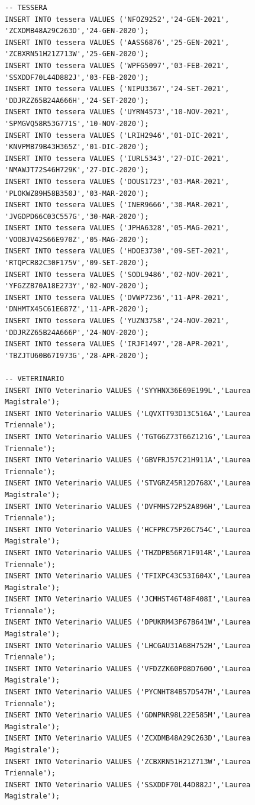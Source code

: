 \documentclass[12pt]{report}
\begin{document}
\begin{scriptsize}
\begin{verbatim}
-- TESSERA
INSERT INTO tessera VALUES ('NFOZ9252','24-GEN-2021', 'ZCXDMB48A29C263D','24-GEN-2020');
INSERT INTO tessera VALUES ('AASS6876','25-GEN-2021', 'ZCBXRN51H21Z713W','25-GEN-2020');
INSERT INTO tessera VALUES ('WPFG5097','03-FEB-2021', 'SSXDDF70L44D882J','03-FEB-2020');
INSERT INTO tessera VALUES ('NIPU3367','24-SET-2021', 'DDJRZZ65B24A666H','24-SET-2020');
INSERT INTO tessera VALUES ('UYRN4573','10-NOV-2021', 'SPMGVQ58R53G771S','10-NOV-2020');
INSERT INTO tessera VALUES ('LRIH2946','01-DIC-2021', 'KNVPMB79B43H365Z','01-DIC-2020');
INSERT INTO tessera VALUES ('IURL5343','27-DIC-2021', 'NMAWJT72S46H729K','27-DIC-2020');
INSERT INTO tessera VALUES ('DOUS1723','03-MAR-2021', 'PLOKWZ89H58B350J','03-MAR-2020');
INSERT INTO tessera VALUES ('INER9666','30-MAR-2021', 'JVGDPD66C03C557G','30-MAR-2020');
INSERT INTO tessera VALUES ('JPHA6328','05-MAG-2021', 'VOOBJV42S66E970Z','05-MAG-2020');
INSERT INTO tessera VALUES ('HDOE3730','09-SET-2021', 'RTQPCR82C30F175V','09-SET-2020');
INSERT INTO tessera VALUES ('SODL9486','02-NOV-2021', 'YFGZZB70A18E273Y','02-NOV-2020');
INSERT INTO tessera VALUES ('DVWP7236','11-APR-2021', 'DNHMTX45C61E687Z','11-APR-2020');
INSERT INTO tessera VALUES ('YUZN3758','24-NOV-2021', 'DDJRZZ65B24A666P','24-NOV-2020');
INSERT INTO tessera VALUES ('IRJF1497','28-APR-2021', 'TBZJTU60B67I973G','28-APR-2020');

-- VETERINARIO
INSERT INTO Veterinario VALUES ('SYYHNX36E69E199L','Laurea Magistrale');
INSERT INTO Veterinario VALUES ('LQVXTT93D13C516A','Laurea Triennale');
INSERT INTO Veterinario VALUES ('TGTGGZ73T66Z121G','Laurea Triennale');
INSERT INTO Veterinario VALUES ('GBVFRJ57C21H911A','Laurea Triennale');
INSERT INTO Veterinario VALUES ('STVGRZ45R12D768X','Laurea Magistrale');
INSERT INTO Veterinario VALUES ('DVFMHS72P52A896H','Laurea Triennale');
INSERT INTO Veterinario VALUES ('HCFPRC75P26C754C','Laurea Magistrale');
INSERT INTO Veterinario VALUES ('THZDPB56R71F914R','Laurea Triennale');
INSERT INTO Veterinario VALUES ('TFIXPC43C53I604X','Laurea Magistrale');
INSERT INTO Veterinario VALUES ('JCMHST46T48F408I','Laurea Triennale');
INSERT INTO Veterinario VALUES ('DPUKRM43P67B641W','Laurea Magistrale');
INSERT INTO Veterinario VALUES ('LHCGAU31A68H752H','Laurea Triennale');
INSERT INTO Veterinario VALUES ('VFDZZK60P08D760O','Laurea Magistrale');
INSERT INTO Veterinario VALUES ('PYCNHT84B57D547H','Laurea Triennale');
INSERT INTO Veterinario VALUES ('GDNPNR98L22E585M','Laurea Magistrale');
INSERT INTO Veterinario VALUES ('ZCXDMB48A29C263D','Laurea Magistrale');
INSERT INTO Veterinario VALUES ('ZCBXRN51H21Z713W','Laurea Triennale');
INSERT INTO Veterinario VALUES ('SSXDDF70L44D882J','Laurea Magistrale');


\end{verbatim}
\end{scriptsize}
\end{document}
